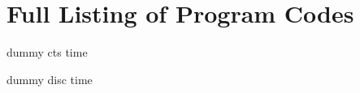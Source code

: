 \chapter{Full Listing of Program Codes}

dummy cts time \label{sc:ctstimespm}

dummy disc time\label{sc:disctimespm}
